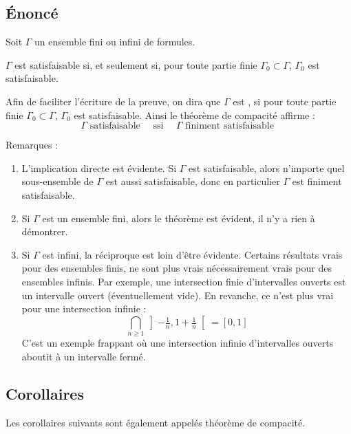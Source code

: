 \documentclass[11pt,class=report,crop=false]{standalone}
\begin{document}
\subsection{Énoncé}

Soit $\Gamma$ un ensemble fini ou infini de formules.

\begin{theoreme}
	$\Gamma$ est satisfaisable si, et seulement si, pour toute partie finie $\Gamma_0 \subset \Gamma$, $\Gamma_0$ est satisfaisable.
\end{theoreme}

Afin de faciliter l'écriture de la preuve, on dira que $\Gamma$ est , si pour toute partie finie $\Gamma_0 \subset \Gamma$, $\Gamma_0$ est satisfaisable. Ainsi le théorème de compacité affirme :
\[
\Gamma \text{ satisfaisable } \quad \text {ssi } \quad \Gamma \text{ finiment satisfaisable } 
\]

Remarques :
\begin{enumerate}
\item L'implication directe est évidente. Si $\Gamma$ est satisfaisable, alors n'importe quel sous-ensemble de $\Gamma$ est aussi satisfaisable, donc en particulier $\Gamma$ est finiment satisfaisable.

\item Si $\Gamma$ est un ensemble fini, alors le théorème est évident, il n'y a rien à démontrer.

\item Si $\Gamma$ est infini, la réciproque est loin d'être évidente. Certains résultats vrais pour des ensembles finis, ne sont plus vrais nécessairement vrais pour des ensembles infinis. Par exemple, une intersection finie d'intervalles ouverts est un intervalle ouvert (éventuellement vide). En revanche, ce n'est plus vrai pour une intersection infinie : 
\[
\bigcap_{n\ge1} {\left] -\tfrac{1}{n} , 1+\tfrac{1}{n} \right[} = [0,1]
\]
C'est un exemple frappant où une intersection infinie d'intervalles ouverts aboutit à un intervalle fermé.
\end{enumerate}


\subsection{Corollaires}

Les corollaires suivants sont également appelés \og{}théorème de compacité\fg{}.
\end{document}
